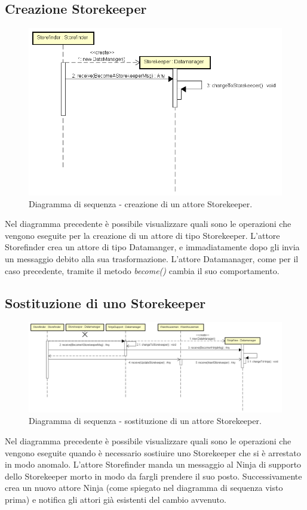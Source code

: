 \documentclass[a4paper]{article}
\begin{document}
         \subsection{Creazione Storekeeper}
            \begin{figure} [H]
				\centering
				\includegraphics[width=\textwidth]{ST/seq/CreazioneStorekeeper.png}
				\caption{Diagramma di sequenza - creazione di un attore Storekeeper.}
			\end{figure}
            Nel diagramma precedente è possibile visualizzare quali sono le operazioni che vengono eseguite per la creazione di un attore di tipo Storekeeper.
            L'attore Storefinder crea un attore di tipo Datamanger, e immadiatamente dopo gli invia un messaggio debito alla sua trasformazione. L'attore 
            Datamanager, come per il caso precedente, tramite il metodo \textit{become()} cambia il suo comportamento.
            
         \subsection{Sostituzione di uno Storekeeper}
            \begin{figure} [H]
				\centering
				\includegraphics[width=\textwidth]{ST/seq/SostituzioneStorekeeper.png}
				\caption{Diagramma di sequenza - sostituzione di un attore Storekeeper.}
			\end{figure}
            Nel diagramma precedente è possibile visualizzare quali sono le operazioni che vengono eseguite quando è necessario sostiuire uno Storekeeper che 
            si è arrestato in modo anomalo. L'attore Storefinder manda un messaggio al Ninja di supporto dello Storekeeper morto in modo da fargli prendere il 
            suo posto. Successivamente crea un nuovo attore Ninja (come spiegato nel diagramma di sequenza visto prima) e notifica gli attori già esistenti del 
            cambio avvenuto.
            
\end{document}
